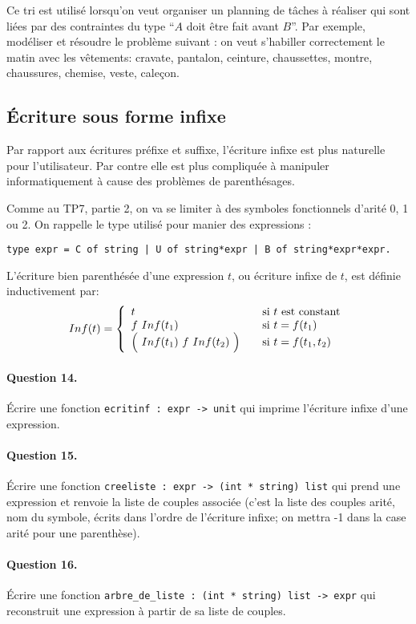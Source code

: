 \documentclass[10pt,a4paper]{article}
\begin{document}
Ce tri est utilisé lorsqu'on veut organiser un planning de tâches à réaliser qui
sont liées par des contraintes du type ``$A$ doit être fait avant $B$''. Par exemple,
modéliser et résoudre le problème suivant : on veut s'habiller correctement le matin
avec les vêtements: cravate, pantalon, ceinture, chaussettes, montre, chaussures,
chemise, veste, caleçon.

\subsection{Écriture sous forme infixe}
Par rapport aux écritures préfixe et suffixe, l'écriture infixe est plus naturelle pour l'utilisateur. Par contre elle est
plus compliquée à manipuler informatiquement à cause des problèmes de parenthésages.

Comme au TP7, partie 2, on va se limiter à des symboles fonctionnels d'arité 0, 1 ou
2. On rappelle le type utilisé pour manier des expressions :
\begin{verbatim}type expr = C of string | U of string*expr | B of string*expr*expr.\end{verbatim}
L'écriture bien parenthésée d'une expression $t$, ou écriture infixe de $t$, est
définie inductivement par:
\[Inf(t)=\left\lbrace
\begin{array}{lcl}
t & & \mathrm{si} \ t \ \mathrm{est \ constant}\\
f \ Inf(t_1) & & \mathrm{si} \ t = f(t_1)\\
\Big ( \normalsize \ Inf(t_1) \ f \ Inf(t_2) \ \Big ) \normalsize & & \mathrm{si} \ t = f(t_1,t_2)
\end{array}\right.\]
\paragraph{Question 14.} Écrire une fonction \texttt{ecritinf : expr -> unit} qui
imprime l'écriture infixe d'une expression.
\paragraph{Question 15.} Écrire une fonction \texttt{creeliste : expr -> (int * string) list}
qui prend une expression et renvoie la liste de couples associée (c'est la liste
des couples arité, nom du symbole, écrits dans l'ordre de l'écriture infixe; on mettra
-1 dans la case arité pour une parenthèse).
\paragraph{Question 16.} Écrire une fonction \texttt{arbre\_de\_liste : (int * string) list -> expr}
qui reconstruit une expression à partir de sa liste de couples.
\end{document}
